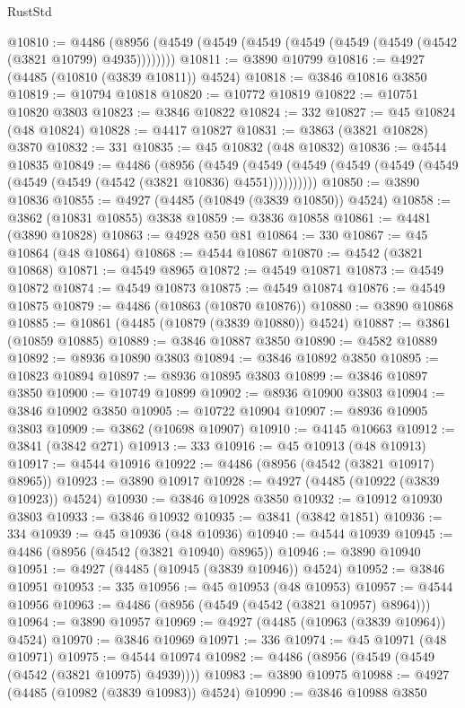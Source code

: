 \begin{lexlean}{RustStd}
\begin{coremodule}
@10810 := @4486 (@8956 (@4549 (@4549 (@4549 (@4549 (@4549 (@4549 (@4542 (@3821 @10799) @4935))))))))
@10811 := @3890 @10799
@10816 := @4927 (@4485 (@10810 (@3839 @10811)) @4524)
@10818 := @3846 @10816 @3850
@10819 := @10794 @10818
@10820 := @10772 @10819
@10822 := @10751 @10820 @3803
@10823 := @3846 @10822
@10824 := 332
@10827 := @45 @10824 (@48 @10824)
@10828 := @4417 @10827
@10831 := @3863 (@3821 @10828) @3870
@10832 := 331
@10835 := @45 @10832 (@48 @10832)
@10836 := @4544 @10835
@10849 := @4486
    (@8956
      (@4549 (@4549 (@4549 (@4549 (@4549 (@4549 (@4549 (@4549 (@4542 (@3821 @10836) @4551))))))))))
@10850 := @3890 @10836
@10855 := @4927 (@4485 (@10849 (@3839 @10850)) @4524)
@10858 := @3862 (@10831 @10855) @3838
@10859 := @3836 @10858
@10861 := @4481 (@3890 @10828)
@10863 := @4928 @50 @81
@10864 := 330
@10867 := @45 @10864 (@48 @10864)
@10868 := @4544 @10867
@10870 := @4542 (@3821 @10868)
@10871 := @4549 @8965
@10872 := @4549 @10871
@10873 := @4549 @10872
@10874 := @4549 @10873
@10875 := @4549 @10874
@10876 := @4549 @10875
@10879 := @4486 (@10863 (@10870 @10876))
@10880 := @3890 @10868
@10885 := @10861 (@4485 (@10879 (@3839 @10880)) @4524)
@10887 := @3861 (@10859 @10885)
@10889 := @3846 @10887 @3850
@10890 := @4582 @10889
@10892 := @8936 @10890 @3803
@10894 := @3846 @10892 @3850
@10895 := @10823 @10894
@10897 := @8936 @10895 @3803
@10899 := @3846 @10897 @3850
@10900 := @10749 @10899
@10902 := @8936 @10900 @3803
@10904 := @3846 @10902 @3850
@10905 := @10722 @10904
@10907 := @8936 @10905 @3803
@10909 := @3862 (@10698 @10907)
@10910 := @4145 @10663
@10912 := @3841 (@3842 @271)
@10913 := 333
@10916 := @45 @10913 (@48 @10913)
@10917 := @4544 @10916
@10922 := @4486 (@8956 (@4542 (@3821 @10917) @8965))
@10923 := @3890 @10917
@10928 := @4927 (@4485 (@10922 (@3839 @10923)) @4524)
@10930 := @3846 @10928 @3850
@10932 := @10912 @10930 @3803
@10933 := @3846 @10932
@10935 := @3841 (@3842 @1851)
@10936 := 334
@10939 := @45 @10936 (@48 @10936)
@10940 := @4544 @10939
@10945 := @4486 (@8956 (@4542 (@3821 @10940) @8965))
@10946 := @3890 @10940
@10951 := @4927 (@4485 (@10945 (@3839 @10946)) @4524)
@10952 := @3846 @10951
@10953 := 335
@10956 := @45 @10953 (@48 @10953)
@10957 := @4544 @10956
@10963 := @4486 (@8956 (@4549 (@4542 (@3821 @10957) @8964)))
@10964 := @3890 @10957
@10969 := @4927 (@4485 (@10963 (@3839 @10964)) @4524)
@10970 := @3846 @10969
@10971 := 336
@10974 := @45 @10971 (@48 @10971)
@10975 := @4544 @10974
@10982 := @4486 (@8956 (@4549 (@4549 (@4542 (@3821 @10975) @4939))))
@10983 := @3890 @10975
@10988 := @4927 (@4485 (@10982 (@3839 @10983)) @4524)
@10990 := @3846 @10988 @3850

\end{coremodule}
\end{lexlean}
